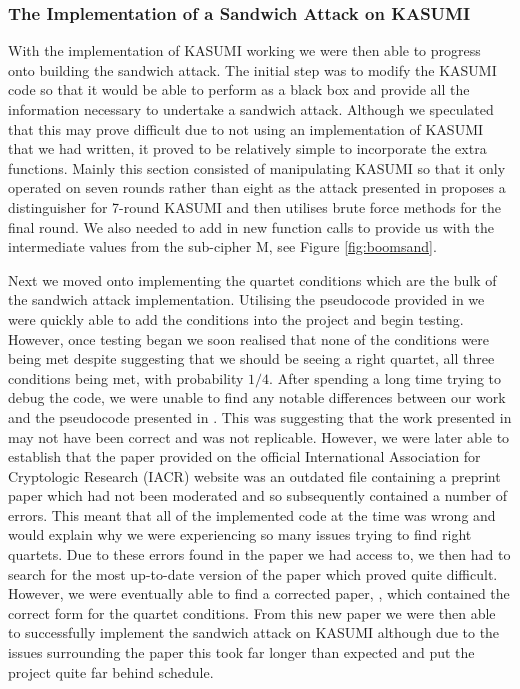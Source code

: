 \documentclass[10pt,journal,compsoc]{IEEEtran}
\begin{document}
\subsubsection{The Implementation of a Sandwich Attack on KASUMI}
With the implementation of KASUMI working we were then able to progress onto building the sandwich attack. The initial step was to modify the KASUMI code so that it would be able to perform as a black box and provide all the information necessary to undertake a sandwich attack. Although we speculated that this may prove difficult due to not using an implementation of KASUMI that we had written, it proved to be relatively simple to incorporate the extra functions. Mainly this section consisted of manipulating KASUMI so that it only operated on seven rounds rather than eight as the attack presented in \cite{C:DunKelSha10} proposes a distinguisher for 7-round KASUMI and then utilises brute force methods for the final round. We also needed to add in new function calls to provide us with the intermediate values from the sub-cipher M, see Figure \ref{fig:boomsand}.

Next we moved onto implementing the quartet conditions which are the bulk of the sandwich attack implementation. Utilising the pseudocode provided in \cite{C:DunKelSha10} we were quickly able to add the conditions into the project and begin testing. However, once testing began we soon realised that none of the conditions were being met despite \cite{C:DunKelSha10} suggesting that we should be seeing a right quartet, all three conditions being met, with probability \(1/4\). After spending a long time trying to debug the code, we were unable to find any notable differences between our work and the pseudocode presented in \cite{C:DunKelSha10}. This was suggesting that the work presented in \cite{C:DunKelSha10} may not have been correct and was not replicable. However, we were later able to establish that the paper provided on the official International Association for Cryptologic Research (IACR) website was an outdated file containing a preprint paper which had not been moderated and so subsequently contained a number of errors. This meant that all of the implemented code at the time was wrong and would explain why we were experiencing so many issues trying to find right quartets. Due to these errors found in the paper we had access to, we then had to search for the most up-to-date version of the paper which proved quite difficult. However, we were eventually able to find a corrected paper, \cite{jofc-2014-25962}, which contained the correct form for the quartet conditions. From this new paper we were then able to successfully implement the sandwich attack on KASUMI although due to the issues surrounding the paper this took far longer than expected and put the project quite far behind schedule.
\end{document}
